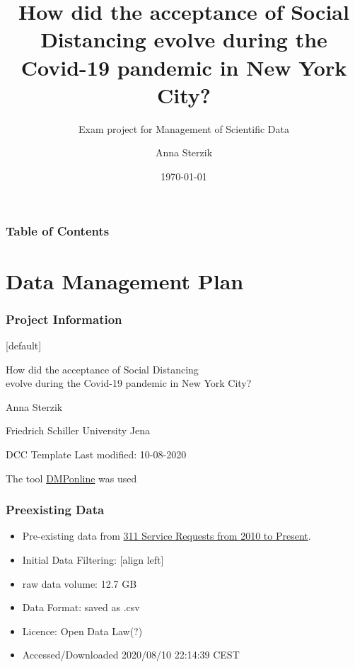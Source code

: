 \documentclass{beamer}
\title{How did the acceptance of Social Distancing evolve during the Covid-19 pandemic in New York City?}
\subtitle{Exam project for Management of Scientific Data}
\author{Anna Sterzik}
\institute{Friedrich Schiller Universität Jena}
\date{\today}
\begin{document}
\frame{\titlepage}
\begin{frame}
\frametitle{Table of Contents}
\tableofcontents
\end{frame}

\section{Data Management Plan}
\begin{frame}
\frametitle{Project Information}
[default]
\begin{description}[style=multiline]
\item[Project name:] How did the acceptance of Social Distancing\\ evolve during the Covid-19 pandemic in New York City?
\vfill
\item[Creator:] Anna Sterzik
\vfill
\item[Affiliation:] Friedrich Schiller University Jena
\vfill
\item[Template:] DCC Template
Last modified: 10-08-2020
\item The tool \href{https://dmponline.dcc.ac.uk/}{DMPonline} was used
\end{description}

\end{frame}
\begin{frame}
\frametitle{Preexisting Data}
\begin{itemize}
\item Pre-existing data from \href{https://data.cityofnewyork.us/Social-Services/311-Service-Requests-from-2010-to-Present/erm2-nwe9}{311 Service Requests from 2010 to Present}.
\vfill
\item Initial Data Filtering:
[align left]
\vfill
\item raw data volume: 12.7 GB
\vfill
\item Data Format: saved as .csv
\vfill
\item Licence: Open Data Law(?)
\vfill
\item Accessed/Downloaded 2020/08/10 22:14:39 CEST
\end{itemize}
\end{frame}
\end{document}
